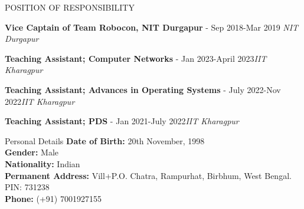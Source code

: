 \documentclass{resume} %
\begin{document}
	\begin{rSection}{POSITION OF RESPONSIBILITY}
		
		{\bf Vice Captain of Team Robocon, NIT Durgapur} - Sep 2018-Mar 2019 \hfill {\em NIT Durgapur} 
		
		{\bf Teaching Assistant; Computer Networks} - Jan 2023-April 2023\hfill {\em IIT Kharagpur}
		
		{\bf Teaching Assistant; Advances in Operating Systems} - July 2022-Nov 2022\hfill {\em IIT Kharagpur}
		
		{\bf Teaching Assistant; PDS} - Jan 2021-July 2022\hfill {\em IIT Kharagpur} 
		
		
		
	\end{rSection}
	
	\begin{rSection}{Personal Details}
		\textbf{Date of Birth:} 20th November, 1998 \\
		\textbf{Gender:} Male \\ 
		\textbf{Nationality:} Indian\\
		\textbf{Permanent Address:} Vill+P.O. Chatra, Rampurhat, Birbhum, West Bengal. PIN: 731238\\
		\textbf{Phone:} (+91) 7001927155
		
	\end{rSection}
	
\end{document}
